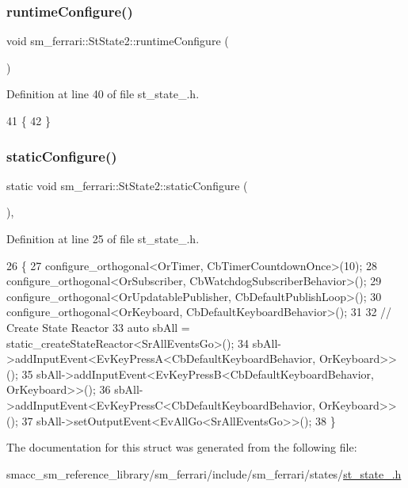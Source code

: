 \subsubsection{\texorpdfstring{runtime\+Configure()}{runtimeConfigure()}}
{\footnotesize\ttfamily void sm\+\_\+ferrari\+::\+St\+State2\+::runtime\+Configure (\begin{DoxyParamCaption}{ }\end{DoxyParamCaption})\hspace{0.3cm}{\ttfamily [inline]}}



Definition at line 40 of file st\+\_\+state\+\_.\+h.


\begin{DoxyCode}
41     \{
42     \}
\end{DoxyCode}
\mbox{\label{structsm__ferrari_1_1StState2_a7767abca55071ed12ae3334b0a720c7c}} 
\subsubsection{\texorpdfstring{static\+Configure()}{staticConfigure()}}
{\footnotesize\ttfamily static void sm\+\_\+ferrari\+::\+St\+State2\+::static\+Configure (\begin{DoxyParamCaption}{ }\end{DoxyParamCaption})\hspace{0.3cm}{\ttfamily [inline]}, {\ttfamily [static]}}



Definition at line 25 of file st\+\_\+state\+\_.\+h.


\begin{DoxyCode}
26     \{
27         configure\_orthogonal<OrTimer, CbTimerCountdownOnce>(10);
28         configure\_orthogonal<OrSubscriber, CbWatchdogSubscriberBehavior>();
29         configure\_orthogonal<OrUpdatablePublisher, CbDefaultPublishLoop>();
30         configure\_orthogonal<OrKeyboard, CbDefaultKeyboardBehavior>();
31 
32         \textcolor{comment}{// Create State Reactor}
33         \textcolor{keyword}{auto} sbAll = static\_createStateReactor<SrAllEventsGo>();
34         sbAll->addInputEvent<EvKeyPressA<CbDefaultKeyboardBehavior, OrKeyboard>>();
35         sbAll->addInputEvent<EvKeyPressB<CbDefaultKeyboardBehavior, OrKeyboard>>();
36         sbAll->addInputEvent<EvKeyPressC<CbDefaultKeyboardBehavior, OrKeyboard>>();
37         sbAll->setOutputEvent<EvAllGo<SrAllEventsGo>>();
38     \}
\end{DoxyCode}


The documentation for this struct was generated from the following file\+:\begin{DoxyCompactItemize}
\item 
smacc\+\_\+sm\+\_\+reference\+\_\+library/sm\+\_\+ferrari/include/sm\+\_\+ferrari/states/\hyperlink{sm__ferrari_2include_2sm__ferrari_2states_2st__state__2_8h}{st\+\_\+state\+\_.\+h}\end{DoxyCompactItemize}
